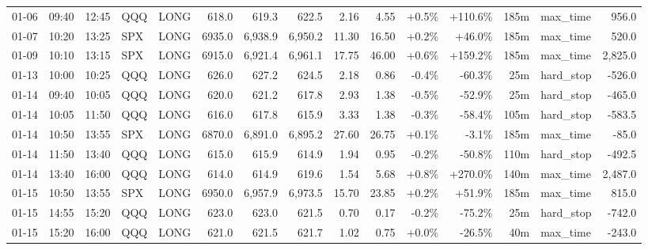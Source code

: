 \documentclass[11pt,a4paper,twoside]{article}
\begin{document}
\begin{landscape}
\begin{center}
\begin{longtable}{>{\color{txtmain}}l l l l l r r r r r r r r >{\color{txtmain}}l r}
01-06 & 09:40 & 12:45 & QQQ & LONG & 618.0 & 619.3 & 622.5 & 2.16 & 4.55 & \textcolor{wingreen}{+0.5\%} & \textcolor{wingreen}{+110.6\%} & 185m & max\_time & \textcolor{wingreen}{956.0} \\
01-07 & 10:20 & 13:25 & SPX & LONG & 6935.0 & 6,938.9 & 6,950.2 & 11.30 & 16.50 & \textcolor{wingreen}{+0.2\%} & \textcolor{wingreen}{+46.0\%} & 185m & max\_time & \textcolor{wingreen}{520.0} \\
01-09 & 10:10 & 13:15 & SPX & LONG & 6915.0 & 6,921.4 & 6,961.1 & 17.75 & 46.00 & \textcolor{wingreen}{+0.6\%} & \textcolor{wingreen}{+159.2\%} & 185m & max\_time & \textcolor{wingreen}{2,825.0} \\
01-13 & 10:00 & 10:25 & QQQ & LONG & 626.0 & 627.2 & 624.5 & 2.18 & 0.86 & \textcolor{lossred}{-0.4\%} & \textcolor{lossred}{-60.3\%} & 25m & hard\_stop & \textcolor{lossred}{-526.0} \\
01-14 & 09:40 & 10:05 & QQQ & LONG & 620.0 & 621.2 & 617.8 & 2.93 & 1.38 & \textcolor{lossred}{-0.5\%} & \textcolor{lossred}{-52.9\%} & 25m & hard\_stop & \textcolor{lossred}{-465.0} \\
01-14 & 10:05 & 11:50 & QQQ & LONG & 616.0 & 617.8 & 615.9 & 3.33 & 1.38 & \textcolor{lossred}{-0.3\%} & \textcolor{lossred}{-58.4\%} & 105m & hard\_stop & \textcolor{lossred}{-583.5} \\
01-14 & 10:50 & 13:55 & SPX & LONG & 6870.0 & 6,891.0 & 6,895.2 & 27.60 & 26.75 & \textcolor{wingreen}{+0.1\%} & \textcolor{lossred}{-3.1\%} & 185m & max\_time & \textcolor{lossred}{-85.0} \\
01-14 & 11:50 & 13:40 & QQQ & LONG & 615.0 & 615.9 & 614.9 & 1.94 & 0.95 & \textcolor{lossred}{-0.2\%} & \textcolor{lossred}{-50.8\%} & 110m & hard\_stop & \textcolor{lossred}{-492.5} \\
01-14 & 13:40 & 16:00 & QQQ & LONG & 614.0 & 614.9 & 619.6 & 1.54 & 5.68 & \textcolor{wingreen}{+0.8\%} & \textcolor{wingreen}{+270.0\%} & 140m & max\_time & \textcolor{wingreen}{2,487.0} \\
01-15 & 10:50 & 13:55 & SPX & LONG & 6950.0 & 6,957.9 & 6,973.5 & 15.70 & 23.85 & \textcolor{wingreen}{+0.2\%} & \textcolor{wingreen}{+51.9\%} & 185m & max\_time & \textcolor{wingreen}{815.0} \\
01-15 & 14:55 & 15:20 & QQQ & LONG & 623.0 & 623.0 & 621.5 & 0.70 & 0.17 & \textcolor{lossred}{-0.2\%} & \textcolor{lossred}{-75.2\%} & 25m & hard\_stop & \textcolor{lossred}{-742.0} \\
01-15 & 15:20 & 16:00 & QQQ & LONG & 621.0 & 621.5 & 621.7 & 1.02 & 0.75 & \textcolor{wingreen}{+0.0\%} & \textcolor{lossred}{-26.5\%} & 40m & max\_time & \textcolor{lossred}{-243.0} \\

\end{longtable}
\end{center}
\end{landscape}
\end{document}
